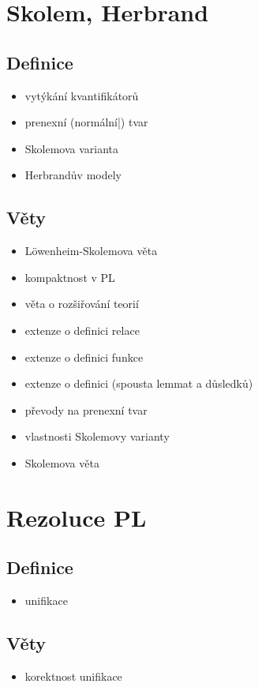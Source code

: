 \documentclass[a4paper]{article}
\begin{document}
\pagebreak

\section{Skolem, Herbrand}

\subsection{Definice}
\begin{itemize}
\item vytýkání kvantifikátorů
\item prenexní (normální|) tvar
\item Skolemova varianta
\item Herbrandův modely
\end{itemize}

\subsection{Věty}
\begin{itemize}
\item Löwenheim-Skolemova věta
\item kompaktnost v PL
\item věta o rozšiřování teorií
\item extenze o definici relace
\item extenze o definici funkce
\item extenze o definici (spousta lemmat a důsledků)
\item převody na prenexní tvar
\item vlastnosti Skolemovy varianty
\item Skolemova věta
\end{itemize}

\pagebreak


\section{Rezoluce PL}

\subsection{Definice}
\begin{itemize}
\item unifikace
\end{itemize}

\subsection{Věty}
\begin{itemize}
\item korektnost unifikace
\end{itemize}
\end{document}
